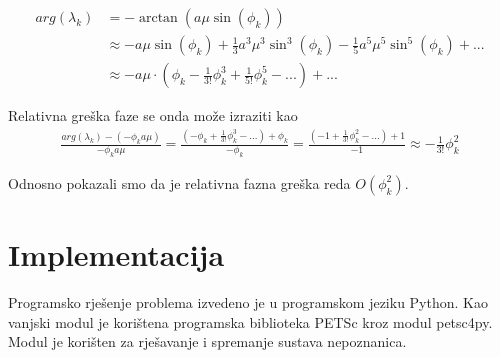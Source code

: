 \documentclass{article}
\begin{document}
\begin{align*}
    arg(\lambda_k) &= -\arctan{(a \mu \sin(\phi_k))} \\
    &\approx -a \mu \sin(\phi_k)
        + \frac{1}{3} a^3 \mu^3 \sin^3(\phi_k)
        - \frac{1}{5} a^5 \mu^5 \sin^5(\phi_k) + ... \\
    &\approx -a \mu \cdot
        \left( \phi_k - \frac{1}{3!}\phi_k^3 + \frac{1}{5!}\phi_k^5 -...\right)
        + ...
\end{align*}

Relativna greška faze se onda može izraziti kao
\begin{align*}
    \frac{arg(\lambda_k) - (- \phi_k a \mu)}{-\phi_k a \mu} =
        \frac{(-\phi_k + \frac{1}{3!}\phi_k^3 - ...) + \phi_k}{-\phi_k} =
        \frac{(-1 + \frac{1}{3!}\phi_k^2 - ...) + 1}{-1} \approx
        -\frac{1}{3!}\phi_k^2
\end{align*}

Odnosno pokazali smo da je relativna fazna greška reda $O(\phi_k^2)$.

\section{Implementacija}

Programsko rješenje problema izvedeno je u programskom jeziku Python. Kao
vanjski modul je korištena programska biblioteka PETSc kroz modul petsc4py.
Modul je korišten za rješavanje i spremanje sustava nepoznanica.
\end{document}
